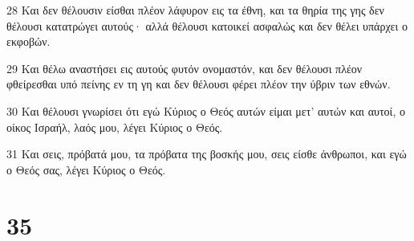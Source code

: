 \par 28 Και δεν θέλουσιν είσθαι πλέον λάφυρον εις τα έθνη, και τα θηρία της γης δεν θέλουσι κατατρώγει αυτούς· αλλά θέλουσι κατοικεί ασφαλώς και δεν θέλει υπάρχει ο εκφοβών.
\par 29 Και θέλω αναστήσει εις αυτούς φυτόν ονομαστόν, και δεν θέλουσι πλέον φθείρεσθαι υπό πείνης εν τη γη και δεν θέλουσι φέρει πλέον την ύβριν των εθνών.
\par 30 Και θέλουσι γνωρίσει ότι εγώ Κύριος ο Θεός αυτών είμαι μετ' αυτών και αυτοί, ο οίκος Ισραήλ, λαός μου, λέγει Κύριος ο Θεός.
\par 31 Και σεις, πρόβατά μου, τα πρόβατα της βοσκής μου, σεις είσθε άνθρωποι, και εγώ ο Θεός σας, λέγει Κύριος ο Θεός.

\chapter{35}

